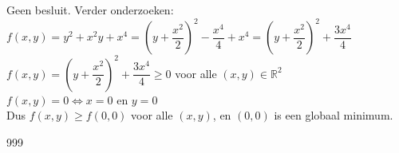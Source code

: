\documentclass[a4paper]{article}
\begin{document}
Geen besluit. Verder onderzoeken:\\

$f(x,y) = y^2 + x^2y + x^4 = \left(y + \dfrac{x^2}{2}\right)^2 - \dfrac{x^4}{4} + x^4 = \left(y + \dfrac{x^2}{2}\right)^2 + \dfrac{3x^4}{4}$\\

$f(x,y) = \left(y + \dfrac{x^2}{2}\right)^2 + \dfrac{3x^4}{4} \geq 0$ voor alle $(x,y) \in \mathbb{R}^2$\\

$f(x,y) = 0 \Leftrightarrow x = 0$ en $y = 0$\\

Dus $f(x,y) \geq f(0,0)$ voor alle $(x,y)$, en $(0,0)$ is een globaal minimum.

\begin{thebibliography}{999}
\end{thebibliography}
\end{document}
